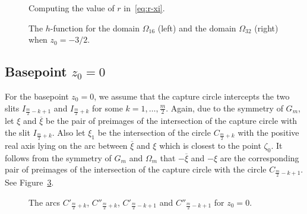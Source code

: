 \begin{figure}[htb] %
	\centerline{\hfill
		\hfill
		\hfill
	}
	\caption{Computing the value of $r$ in~\eqref{eq:r-xi}.}
	\label{fig:3hr}
\end{figure}



\begin{figure}[htb] %
\centerline{
\hfill
{}
}
\caption{The $h$-function for the domain $\Omega_{16}$ (left) and the domain $\Omega_{32}$ (right) when $z_0=-3/2$.}
\label{fig:h-3}
\end{figure}


\subsection{Basepoint $z_0=0$}

For the basepoint $z_0=0$, we assume that the capture circle intercepts the two slits $I_{\frac{m}{2}-k+1}$ and $I_{\frac{m}{2}+k}$ for some $k=1,\ldots,\frac{m}{2}$. Again, due to the symmetry of $G_m$, let $\xi$ and $\overline{\xi}$ be the pair of preimages of the intersection of the capture circle with the slit $I_{\frac{m}{2}+k}$. Also let $\xi_1$ be the intersection of the circle $C_{\frac{m}{2}+k}$ with the positive real axis lying on the arc between $\overline{\xi}$ and $\xi$ which is closest to the point $\zeta_0$. It follows from the symmetry of $G_m$ and $\Omega_m$ that $-\overline{\xi}$ and $-\xi$ are the corresponding pair of preimages of the intersection of the capture circle with the circle $C_{\frac{m}{2}-k+1}$. See Figure~\ref{fig:h0d}.

\begin{figure}[htb] %
\centerline{
}
\caption{The arcs $C'_{\frac{m}{2}+k}$, $C''_{\frac{m}{2}+k}$, $C'_{\frac{m}{2}-k+1}$ and $C''_{\frac{m}{2}-k+1}$ for $z_0=0$.}
\label{fig:h0d}
\end{figure}

